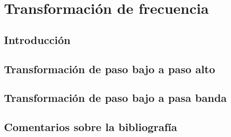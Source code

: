 \documentclass[oneside,a4paper,10pt]{scrbook}
\begin{document}
	\clearpage
	
    \chapter{Transformación de frecuencia}
	{
		\section{Introducción}
   		{
    				
		}
		
		\clearpage	
		
		\section{Transformación de paso bajo a paso alto}
   		{
    				
		}
		
		\clearpage
		
		\section{Transformación de paso bajo a pasa banda}
   		{
    				
		}
		
		\clearpage
		
		\section{Comentarios sobre la bibliografía}
   		{
    						
		}		
		
	}
	
	\clearpage
	
%    
%    
        
\end{document}
